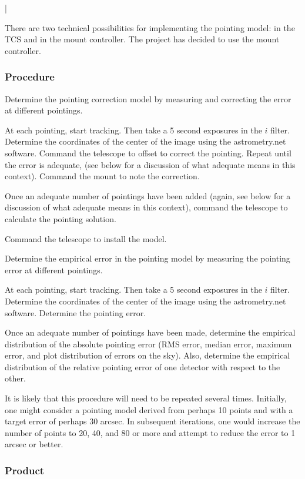 |\documentclass{article}
\begin{document}
There are two technical possibilities for implementing the pointing model: in the TCS and in the mount controller. The project has decided to use the mount controller.

\subsubsection{Procedure}

Determine the pointing correction model by measuring and correcting the error at different pointings. 

At each pointing, start tracking. Then take a 5 second exposures in the $i$ filter. Determine the coordinates of the center of the image using the astrometry.net software. Command the telescope to offset to correct the pointing. Repeat until the error is adequate, (see below for a discussion of what adequate means in this context). Command the mount to note the correction. 

Once an adequate number of pointings have been added (again, see below for a discussion of what adequate means in this context), command the telescope to calculate the pointing solution.

Command the telescope to install the model.

Determine the empirical error in the pointing model by measuring the pointing error at different pointings.

At each pointing, start tracking. Then take a 5 second exposures in the $i$ filter. Determine the coordinates of the center of the image using the astrometry.net software. Determine the pointing error. 

Once an adequate number of pointings have been made, determine the empirical distribution of the absolute pointing error (RMS error, median error, maximum error, and plot distribution of errors on the sky). Also, determine the empirical distribution of the relative pointing error of one detector with respect to the other.

It is likely that this procedure will need to be repeated several times. Initially, one might consider a pointing model derived from perhaps 10 points and with a target error of perhaps 30 arcsec. In subsequent iterations, one would increase the number of points to 20, 40, and 80 or more and attempt to reduce the error to 1 arcsec or better.

\subsubsection{Product}
\end{document}
